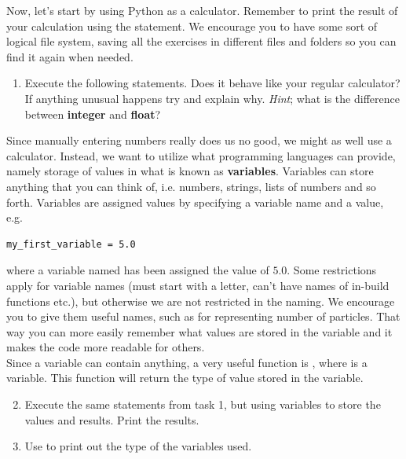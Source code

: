 \documentclass{article}
\begin{document}
Now, let's start by using Python as a calculator.
Remember to print the result of your calculation using the  statement.
We encourage you to have some sort of logical file system, saving all the exercises in
different files and folders so you can find it again when needed.

\begin{enumerate}
  \item Execute the following statements. Does it behave like your regular
    calculator? If anything unusual happens try and explain why.
    {\em Hint}; what is the difference between {\bf integer} and {\bf float}?

    \begin{centering}
    \end{centering}
\end{enumerate}

Since manually entering numbers really does us no good, we might as well use a
calculator. Instead, we want to utilize what programming languages can provide,
namely storage of values in what is known as {\bf variables}. Variables can store
anything that you can think of, i.e. numbers, strings, lists of numbers and so
forth. Variables are assigned values by specifying a variable name and a value, e.g.

\begin{lstlisting}
my_first_variable = 5.0
\end{lstlisting}

where a variable named  has been assigned the value
of $5.0$.
Some restrictions apply for variable names (must start with a letter, can't have names of
in-build functions etc.), but otherwise we are not restricted in the naming. We encourage you to give
them useful names, such as  for representing number of
particles. That way you can more easily remember what values are stored in the variable
and it makes the code more readable for others.\\

Since a variable can contain anything, a very useful function is ,
where  is a variable. This function will return the type of value stored
in the variable.

\begin{enumerate}
  \setcounter{enumi}{1}
  \item Execute the same statements from task 1, but using variables to store
    the values and results. Print the results.
  \item Use  to print out the type of the variables used.
\end{enumerate}
\end{document}
